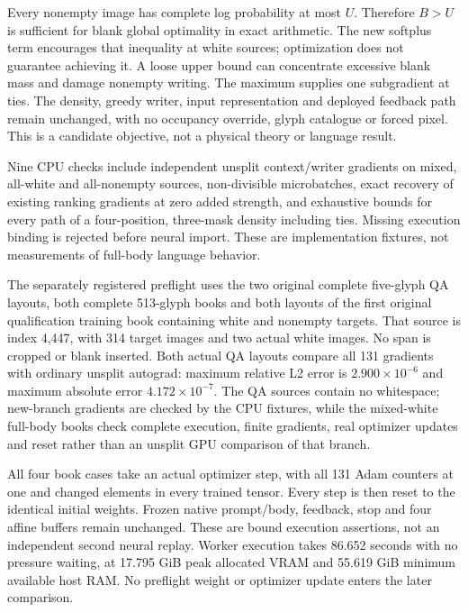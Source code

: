 \documentclass[12pt,a4paper]{article}
\providecommand{\DIFadd}[1]{{\protect\color{blue} \sf #1}} %
\begin{document}
\DIFadd{Every nonempty image has complete log probability at most $U$. Therefore
$B>U$ is sufficient for blank global optimality in exact arithmetic. The new
softplus term encourages that inequality at white sources; optimization does
not guarantee achieving it. A loose upper bound can concentrate excessive
blank mass and damage nonempty writing. The maximum supplies one subgradient
at ties. The density, greedy writer, input representation and deployed feedback
path remain unchanged, with no occupancy override, glyph catalogue or forced
pixel. This is a candidate objective, not a physical theory or language result.
}

\DIFadd{Nine CPU checks include independent unsplit context/writer gradients on mixed,
all-white and all-nonempty sources, non-divisible microbatches, exact recovery
of existing ranking gradients at zero added strength, and exhaustive bounds
for every path of a four-position, three-mask density including ties. Missing
execution binding is rejected before neural import. These are implementation
fixtures, not measurements of full-body language behavior.
}

\DIFadd{The separately registered preflight uses the two original complete five-glyph
QA layouts, both complete 513-glyph books and both layouts of the first original
qualification training book containing white and nonempty targets. That source
is index 4,447, with 314 target images and two actual white images. No span is
cropped or blank inserted. Both actual QA layouts compare all 131 gradients
with ordinary unsplit autograd: maximum relative L2 error is
$2.900\times10^{-6}$ and maximum absolute error $4.172\times10^{-7}$.
The QA sources contain no whitespace; new-branch gradients are checked by the
CPU fixtures, while the mixed-white full-body books check complete execution,
finite gradients, real optimizer updates and reset rather than an unsplit GPU
comparison of that branch.
}

\DIFadd{All four book cases take an actual optimizer step, with all 131 Adam counters
at one and changed elements in every trained tensor. Every step is then reset
to the identical initial weights. Frozen native prompt/body, feedback, stop
and four affine buffers remain unchanged. These are bound execution assertions,
not an independent second neural replay. Worker execution takes 86.652 seconds
with no pressure waiting, at 17.795 GiB peak allocated VRAM and 55.619 GiB
minimum available host RAM. No preflight weight or optimizer update enters
the later comparison.
}
\end{document}
